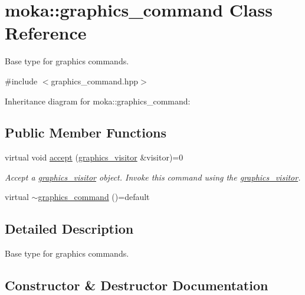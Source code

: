 \hypertarget{classmoka_1_1graphics__command}{}\section{moka\+::graphics\+\_\+command Class Reference}
\label{classmoka_1_1graphics__command}


Base type for graphics commands.  




{\ttfamily \#include $<$graphics\+\_\+command.\+hpp$>$}



Inheritance diagram for moka\+::graphics\+\_\+command\+:
\subsection*{Public Member Functions}
\begin{DoxyCompactItemize}
\item 
virtual void \mbox{\hyperlink{classmoka_1_1graphics__command_a7affaeceb1019ab358c62185bce4e654}{accept}} (\mbox{\hyperlink{classmoka_1_1graphics__visitor}{graphics\+\_\+visitor}} \&visitor)=0
\begin{DoxyCompactList}\small\item\em Accept a \mbox{\hyperlink{classmoka_1_1graphics__visitor}{graphics\+\_\+visitor}} object. Invoke this command using the \mbox{\hyperlink{classmoka_1_1graphics__visitor}{graphics\+\_\+visitor}}. \end{DoxyCompactList}\item 
virtual \mbox{\hyperlink{classmoka_1_1graphics__command_af6e6100d7c1a139c30fed480dc210442}{$\sim$graphics\+\_\+command}} ()=default
\end{DoxyCompactItemize}


\subsection{Detailed Description}
Base type for graphics commands. 

\subsection{Constructor \& Destructor Documentation}
\mbox{\label{classmoka_1_1graphics__command_af6e6100d7c1a139c30fed480dc210442}} 
